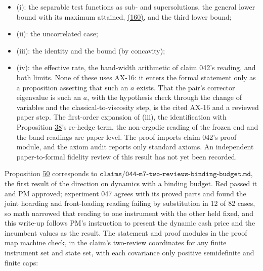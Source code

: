 \documentclass[11pt]{article}
\begin{document}
\begin{itemize}
  \item (i): the separable test functions as sub- and supersolutions, the
  general lower bound with its maximum attained, \hyperref[eq:160]{(160)}, and the third
  lower bound;
  \item (ii): the uncorrelated case;
  \item (iii): the identity and the bound (by concavity);
  \item (iv): the effective rate, the band-width arithmetic of claim 042's
  reading, and both limits.
None of these uses AX-16: it enters the formal statement only as a
proposition asserting that such an \(a\) exists. That the pair's corrector
eigenvalue is such an \(a\), with the hypothesis check through the change
of variables and the classical-to-viscosity step, is the cited AX-16
and a reviewed paper step. The first-order expansion of (iii), the
identification with Proposition \hyperref[res:Proposition-38]{38}'s re-hedge term, the non-ergodic
reading of the frozen end and the band readings are paper level. The
proof imports claim 042's proof module, and the axiom audit reports
only standard axioms. An independent paper-to-formal fidelity review
of this result has not yet been recorded.
\end{itemize}

Proposition \hyperref[res:Proposition-50]{50} corresponds to
\(\texttt{claims/044-m7-two-reviews-binding-budget.md}\), the first result of the
direction on dynamics with a binding budget. Red passed it and PM
approved; experiment 047 agrees with its proved parts and found the
joint hoarding and front-loading reading failing by substitution in 12
of 82 cases, so math narrowed that reading to one instrument with the
other held fixed, and this write-up follows PM's instruction to present
the dynamic cash price and the incumbent values as the result. The
statement and proof modules in the proof map machine check, in the
claim's two-review coordinates for any finite instrument set and state
set, with each covariance only positive semidefinite and finite caps:
\end{document}
